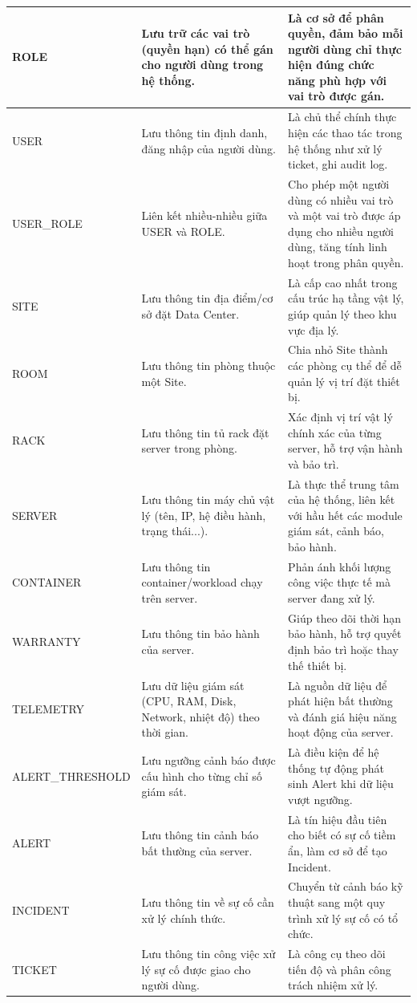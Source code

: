 \begin{center}
\begin{longtable}{|>{\raggedright\arraybackslash}p{3.5cm}|>{\raggedright\arraybackslash}p{5.5cm}|>{\raggedright\arraybackslash}p{5.5cm}|}
ROLE & Lưu trữ các vai trò (quyền hạn) có thể gán cho người dùng trong hệ thống. & Là cơ sở để phân quyền, đảm bảo mỗi người dùng chỉ thực hiện đúng chức năng phù hợp với vai trò được gán. \\ \hline
USER & Lưu thông tin định danh, đăng nhập của người dùng. & Là chủ thể chính thực hiện các thao tác trong hệ thống như xử lý ticket, ghi audit log. \\ \hline
USER\_ROLE & Liên kết nhiều-nhiều giữa USER và ROLE. & Cho phép một người dùng có nhiều vai trò và một vai trò được áp dụng cho nhiều người dùng, tăng tính linh hoạt trong phân quyền. \\ \hline
SITE & Lưu thông tin địa điểm/cơ sở đặt Data Center. & Là cấp cao nhất trong cấu trúc hạ tầng vật lý, giúp quản lý theo khu vực địa lý. \\ \hline
ROOM & Lưu thông tin phòng thuộc một Site. & Chia nhỏ Site thành các phòng cụ thể để dễ quản lý vị trí đặt thiết bị. \\ \hline
RACK & Lưu thông tin tủ rack đặt server trong phòng. & Xác định vị trí vật lý chính xác của từng server, hỗ trợ vận hành và bảo trì. \\ \hline
SERVER & Lưu thông tin máy chủ vật lý (tên, IP, hệ điều hành, trạng thái...). & Là thực thể trung tâm của hệ thống, liên kết với hầu hết các module giám sát, cảnh báo, bảo hành. \\ \hline
CONTAINER & Lưu thông tin container/workload chạy trên server. & Phản ánh khối lượng công việc thực tế mà server đang xử lý. \\ \hline
WARRANTY & Lưu thông tin bảo hành của server. & Giúp theo dõi thời hạn bảo hành, hỗ trợ quyết định bảo trì hoặc thay thế thiết bị. \\ \hline
TELEMETRY & Lưu dữ liệu giám sát (CPU, RAM, Disk, Network, nhiệt độ) theo thời gian. & Là nguồn dữ liệu để phát hiện bất thường và đánh giá hiệu năng hoạt động của server. \\ \hline
ALERT\_THRESHOLD & Lưu ngưỡng cảnh báo được cấu hình cho từng chỉ số giám sát. & Là điều kiện để hệ thống tự động phát sinh Alert khi dữ liệu vượt ngưỡng. \\ \hline
ALERT & Lưu thông tin cảnh báo bất thường của server. & Là tín hiệu đầu tiên cho biết có sự cố tiềm ẩn, làm cơ sở để tạo Incident. \\ \hline
INCIDENT & Lưu thông tin về sự cố cần xử lý chính thức. & Chuyển từ cảnh báo kỹ thuật sang một quy trình xử lý sự cố có tổ chức. \\ \hline
TICKET & Lưu thông tin công việc xử lý sự cố được giao cho người dùng. & Là công cụ theo dõi tiến độ và phân công trách nhiệm xử lý. \\ \hline

\end{longtable}
\end{center}
